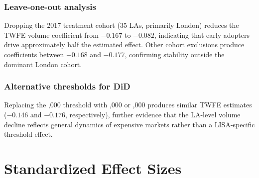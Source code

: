 \documentclass[12pt]{article}
\begin{document}
\subsubsection*{Leave-one-out analysis} Dropping the 2017 treatment cohort (35 LAs, primarily London) reduces the TWFE volume coefficient from $-0.167$ to $-0.082$, indicating that early adopters drive approximately half the estimated effect. Other cohort exclusions produce coefficients between $-0.168$ and $-0.177$, confirming stability outside the dominant London cohort.

\subsubsection*{Alternative thresholds for DiD} Replacing the ,000 threshold with ,000 or ,000 produces similar TWFE estimates ($-0.146$ and $-0.176$, respectively), further evidence that the LA-level volume decline reflects general dynamics of expensive markets rather than a LISA-specific threshold effect.

\section{Standardized Effect Sizes}
\label{sec:sde}


\end{document}
